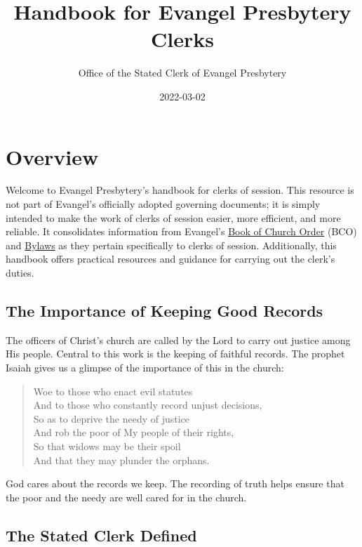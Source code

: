 \documentclass[
]{book}
\title{Handbook for Evangel Presbytery Clerks}
\author{Office of the Stated Clerk of Evangel Presbytery}
\date{2022-03-02}
\begin{document}
\maketitle

{
\setcounter{tocdepth}{1}
\tableofcontents
}
\hypertarget{overview}{%
\chapter{Overview}\label{overview}}

Welcome to Evangel Presbytery's handbook for clerks of session. This resource is not part of Evangel's officially adopted governing documents; it is simply intended to make the work of clerks of session easier, more efficient, and more reliable. It consolidates information from Evangel's \href{https://evangel.pressbooks.com/}{Book of Church Order} (BCO) and \href{https://evangelpresbytery.com/documents/}{Bylaws} as they pertain specifically to clerks of session. Additionally, this handbook offers practical resources and guidance for carrying out the clerk's duties.

\hypertarget{the-importance-of-keeping-good-records}{%
\section{The Importance of Keeping Good Records}\label{the-importance-of-keeping-good-records}}

The officers of Christ's church are called by the Lord to carry out justice among His people. Central to this work is the keeping of faithful records. The prophet Isaiah gives us a glimpse of the importance of this in the church:

\begin{quote}
Woe to those who enact evil statutes\\
And to those who constantly record unjust decisions,\\
So as to deprive the needy of justice\\
And rob the poor of My people of their rights,\\
So that widows may be their spoil\\
And that they may plunder the orphans.
\end{quote}

God cares about the records we keep. The recording of truth helps ensure that the poor and the needy are well cared for in the church.

\hypertarget{the-stated-clerk-defined}{%
\section{The Stated Clerk Defined}\label{the-stated-clerk-defined}}
\end{document}
